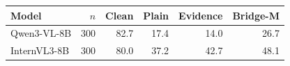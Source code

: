 \begin{tabular}{lrrrrr}
\toprule
Model & $n$ & Clean & Plain & Evidence & Bridge-M \\
\midrule
Qwen3-VL-8B & 300 & 82.7 & 17.4 & 14.0 & 26.7 \\
InternVL3-8B & 300 & 80.0 & 37.2 & 42.7 & 48.1 \\
\bottomrule
\end{tabular}
